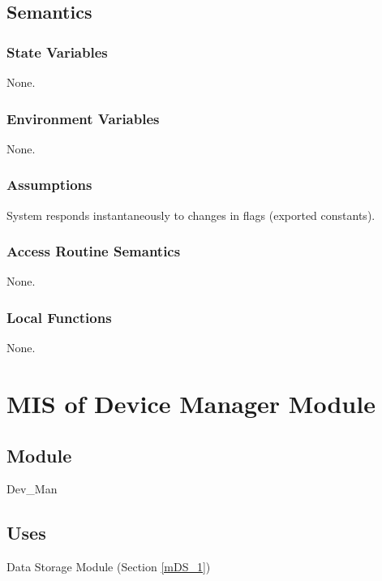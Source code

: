 \documentclass[12pt, titlepage]{article}
\begin{document}
\subsection{Semantics}

\subsubsection{State Variables}

None.

\subsubsection{Environment Variables}

None.

\subsubsection{Assumptions}

System responds instantaneously to changes in flags (exported constants).

\subsubsection{Access Routine Semantics}

None.

\subsubsection{Local Functions}

None.

\newpage



\section{MIS of Device Manager Module} \label{mDM} 

\subsection{Module}

Dev\_Man

\subsection{Uses}

Data Storage Module (Section \ref{mDS_1})
\end{document}
